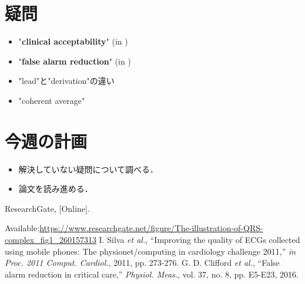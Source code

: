 \documentclass[dvipdfmx]{jsarticle}
\begin{document}
\section{疑問}
\begin{itemize}
    \item "\textbf{clinical acceptability}" (in \cite{one})
    \item "\textbf{false alarm reduction}" (in \cite{two})
    \item "lead"と"derivation"の違い
    \item "coherent average"
\end{itemize}
\section{今週の計画}
\begin{itemize}
    \item 解決していない疑問について調べる．
    \item 論文を読み進める．
\end{itemize}
\begin{thebibliography}{99}
 ResearchGate, [Online]. 

Available:\url{https://www.researchgate.net/figure/The-illustration-of-QRS-complex_fig1_260157313}
 I. Silva \textit{et al.}, “Improving the quality of ECGs collected using mobile phones: The physionet/computing in cardiology challenge 2011,” \textit{in Proc. 2011 Comput. Cardiol.}, 2011, pp. 273-276.
 G. D. Clifford \textit{et al.}, “False alarm reduction in critical care,” \textit{Physiol. Meas.}, vol. 37, no. 8, pp. E5-E23, 2016.
\end{thebibliography}
\end{document}
